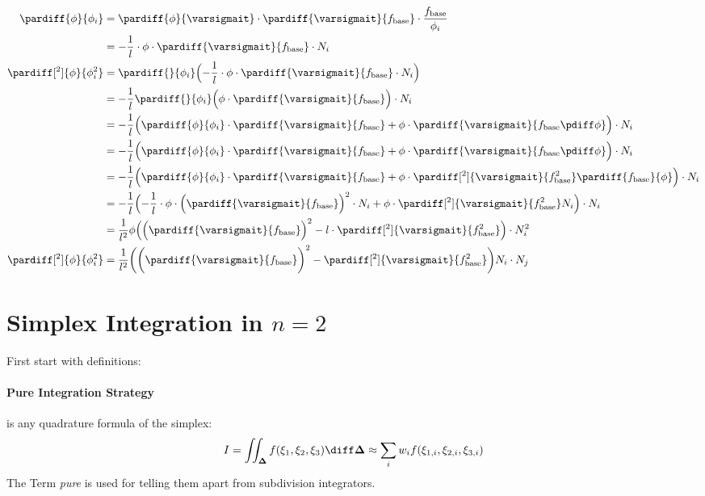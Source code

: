 \documentclass{mitschrift}
\newcommand{\simplex}{\boldsymbol{\Delta}}
\begin{document}
\begin{align}
    \pardiff{\phi}{\phi_i} &= \pardiff{\phi}{\varsigmait} \cdot \pardiff{\varsigmait}{f_{\text{base}}} \cdot \frac{f_{\text{base}}}{\phi_i} \\
    &= -\frac{1}{l} \cdot \phi \cdot \pardiff{\varsigmait}{f_{\text{base}}} \cdot N_i \\
    \pardiff[^2]{\phi}{\phi_i^2} &= \pardiff{}{\phi_i} \Bigl(  -\frac{1}{l} \cdot \phi \cdot \pardiff{\varsigmait}{f_{\text{base}}} \cdot N_i  \Bigr)\\
    &= -\frac{1}{l} \pardiff{}{\phi_i} \Bigl( \phi \cdot \pardiff{\varsigmait}{f_{\text{base}}} \Bigr)\cdot N_i \\
    &= -\frac{1}{l} \Bigl( \pardiff{\phi}{\phi_i} \cdot \pardiff{\varsigmait}{f_{\text{base}}} + \phi \cdot \pardiff{\varsigmait}{f_{\text{base}} \pdiff \phi} \Bigr)\cdot N_i \\
    &= -\frac{1}{l} \Bigl( \pardiff{\phi}{\phi_i} \cdot \pardiff{\varsigmait}{f_{\text{base}}} + \phi \cdot \pardiff{\varsigmait}{f_{\text{base}} \pdiff \phi} \Bigr)\cdot N_i \\
    &= -\frac{1}{l} \Bigl( \pardiff{\phi}{\phi_i} \cdot \pardiff{\varsigmait}{f_{\text{base}}} + \phi \cdot \pardiff[^2]{\varsigmait}{f_{\text{base}}^2} \pardiff{f_{\text{base}}}{\phi} \Bigr)\cdot N_i \\
    &= -\frac{1}{l} \Bigl( -\frac{1}{l} \cdot \phi \cdot \Bigl(\pardiff{\varsigmait}{f_{\text{base}}}\Bigr)^2 \cdot N_i + \phi \cdot \pardiff[^2]{\varsigmait}{f_{\text{base}}^2} N_i \Bigr)\cdot N_i \\
    &= \frac{1}{l^2}\phi \Bigl( \Bigl(\pardiff{\varsigmait}{f_{\text{base}}}\Bigr)^2 - l \cdot \pardiff[^2]{\varsigmait}{f_{\text{base}}^2} \Bigr)\cdot N_i^2 \\
    \pardiff[^2]{\phi}{\phi_i^2} &= \frac{1}{l^2} \biggl( \biggl(\pardiff{\varsigmait}{f_{\text{base}}}\biggr)^2 - \pardiff[^2]{\varsigmait}{f_{\text{base}}^2} \biggr) N_i \cdot N_j \\
\end{align}

\pagebreak

\section{Simplex Integration in $n=2$}


First start with definitions:

\paragraph{Pure Integration Strategy} is any quadrature formula of the simplex: \begin{equation}
    I = \iint_{\simplex} f(\xi_1, \xi_2, \xi_3) \diff \simplex \approx \sum_{i} w_i f(\xi_{1,i}, \xi_{2,i}, \xi_{3,i})
\end{equation} The Term \emph{pure} is used for telling them apart from subdivision integrators.
\end{document}

